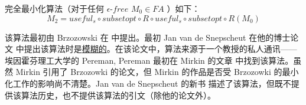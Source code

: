 完全最小化算法（对于任何 $\epsilon$-$free$ $M_0\in FA$ ）如下：
$$  M_2 = useful_s \circ subsetopt \circ R \circ useful_s \circ subsetopt \circ R(M_0) $$

该算法最初由 Brzozowski 在 \cite{Brzo62} 中提出。最初 Jan van de Snepscheut 在他的博士论文 \cite{vdSn85}中提出该算法时是\uline{模糊的}。在该论文中，算法来源于一个教授的私人通讯——埃因霍芬理工大学的 Pereman, Pereman 最初在 Mirkin 的文章 \cite{Mirk65} 中找到该算法。虽然 Mirkin 引用了 Brzozowki \cite{Brzo64} 的论文，但 Mirkin 的作品是否受 Brzozowki 的最小化工作的影响尚不清楚。Jan van de Snepscheut 的新书\cite{VDSn93} 描述了该算法，但既不提供该算法历史，也不提供该算法的引文（除他的论文外）。
